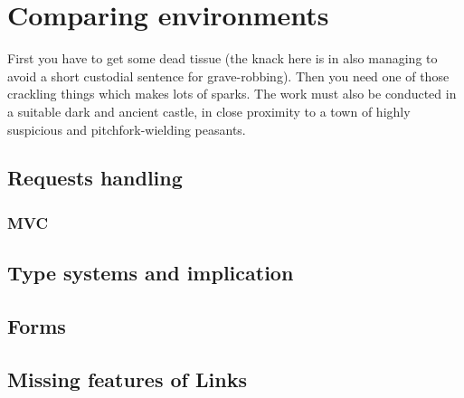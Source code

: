 
\chapter{Comparing environments}

First you have to get some dead tissue (the knack here is in also managing to
avoid a short custodial sentence for grave-robbing). Then you need one of
those crackling things which makes lots of sparks. The work must also be
conducted in a suitable dark and ancient castle, in close proximity to a town
of highly suspicious and pitchfork-wielding peasants.

\section{Requests handling}

\subsection{MVC}

\section{Type systems and implication}

\section{Forms}

\section{Missing features of Links}
